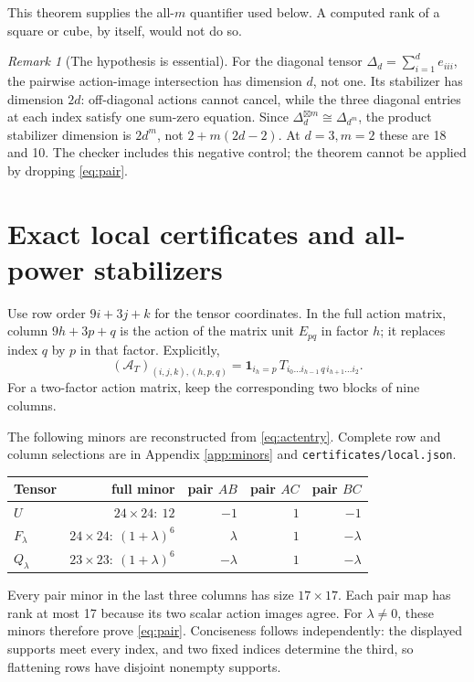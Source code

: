 \documentclass[11pt]{article}
\theoremstyle{remark}\newtheorem{remark}[theorem]{Remark}
\newcommand{\gp}{\boxtimes}
\begin{document}
This theorem supplies the all-$m$ quantifier used below. A computed rank of a square or cube, by itself, would not do so.

\begin{remark}[The hypothesis is essential]
For the diagonal tensor $\Delta_d=\sum_{i=1}^d e_{iii}$, the pairwise action-image intersection has dimension $d$, not one. Its stabilizer has dimension $2d$: off-diagonal actions cannot cancel, while the three diagonal entries at each index satisfy one sum-zero equation. Since $\Delta_d^{\gp m}\cong\Delta_{d^m}$, the product stabilizer dimension is $2d^m$, not $2+m(2d-2)$. At $d=3,m=2$ these are 18 and 10. The checker includes this negative control; the theorem cannot be applied by dropping \eqref{eq:pair}.
\end{remark}


\section{Exact local certificates and all-power stabilizers}\label{sec:local}
Use row order $9i+3j+k$ for the tensor coordinates. In the full action matrix, column $9h+3p+q$ is the action of the matrix unit $E_{pq}$ in factor $h$; it replaces index $q$ by $p$ in that factor. Explicitly,
\begin{equation}\label{eq:actentry}
 (\mathcal A_T)_{(i,j,k),(h,p,q)}
 =\mathbf1_{i_h=p}\,T_{i_0\ldots i_{h-1}\,q\,i_{h+1}\ldots i_2}.
\end{equation}
For a two-factor action matrix, keep the corresponding two blocks of nine columns.

The following minors are reconstructed from \eqref{eq:actentry}. Complete row and column selections are in Appendix \ref{app:minors} and \texttt{certificates/local.json}.
\begin{center}
\begin{tabular}{lrrrr}
\toprule
Tensor & full minor & pair $AB$ & pair $AC$ & pair $BC$\\
\midrule
$U$ & $24\times24:\ 12$ & $-1$ & $1$ & $-1$\\
$F_\lambda$ & $24\times24:\ (1+\lambda)^6$ & $\lambda$ & $1$ & $-\lambda$\\
$Q_\lambda$ & $23\times23:\ (1+\lambda)^6$ & $-\lambda$ & $1$ & $-\lambda$\\
\bottomrule
\end{tabular}
\end{center}
Every pair minor in the last three columns has size $17\times17$. Each pair map has rank at most 17 because its two scalar action images agree. For $\lambda\ne0$, these minors therefore prove \eqref{eq:pair}. Conciseness follows independently: the displayed supports meet every index, and two fixed indices determine the third, so flattening rows have disjoint nonempty supports.
\end{document}
